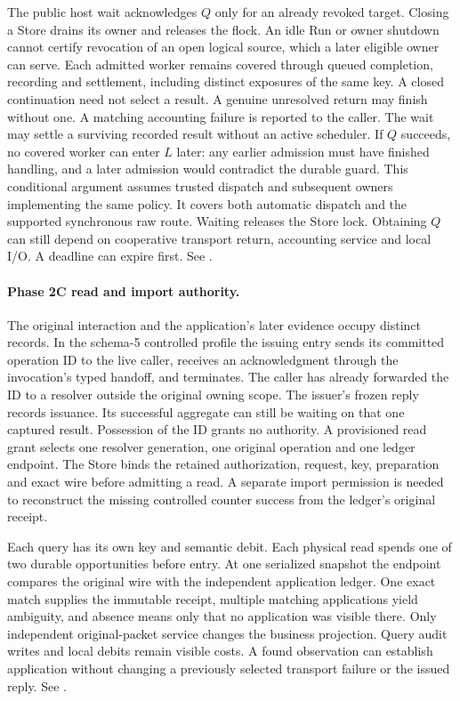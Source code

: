 \documentclass[11pt,a4paper]{article}
\theoremstyle{definition}
\theoremstyle{remark}
\begin{document}
The public host wait acknowledges $Q$ only for an already revoked target. Closing a Store drains its owner and releases the flock. An idle Run or owner shutdown cannot certify revocation of an open logical source, which a later eligible owner can serve. Each admitted worker remains covered through queued completion, recording and settlement, including distinct exposures of the same key. A closed continuation need not select a result. A genuine unresolved return may finish without one. A matching accounting failure is reported to the caller. The wait may settle a surviving recorded result without an active scheduler. If $Q$ succeeds, no covered worker can enter $L$ later: any earlier admission must have finished handling, and a later admission would contradict the durable guard. This conditional argument assumes trusted dispatch and subsequent owners implementing the same policy. It covers both automatic dispatch and the supported synchronous raw route. Waiting releases the Store lock. Obtaining $Q$ can still depend on cooperative transport return, accounting service and local I/O. A deadline can expire first. See .

\paragraph{Phase 2C read and import authority.} The original interaction and the application's later evidence occupy distinct records. In the schema-5 controlled profile the issuing entry sends its committed operation ID to the live caller, receives an acknowledgment through the invocation's typed handoff, and terminates. The caller has already forwarded the ID to a resolver outside the original owning scope. The issuer's frozen reply records issuance. Its successful aggregate can still be waiting on that one captured result. Possession of the ID grants no authority. A provisioned read grant selects one resolver generation, one original operation and one ledger endpoint. The Store binds the retained authorization, request, key, preparation and exact wire before admitting a read. A separate import permission is needed to reconstruct the missing controlled counter success from the ledger's original receipt.

Each query has its own key and semantic debit. Each physical read spends one of two durable opportunities before entry. At one serialized snapshot the endpoint compares the original wire with the independent application ledger. One exact match supplies the immutable receipt, multiple matching applications yield ambiguity, and absence means only that no application was visible there. Only independent original-packet service changes the business projection. Query audit writes and local debits remain visible costs. A found observation can establish application without changing a previously selected transport failure or the issued reply. See .
\end{document}
